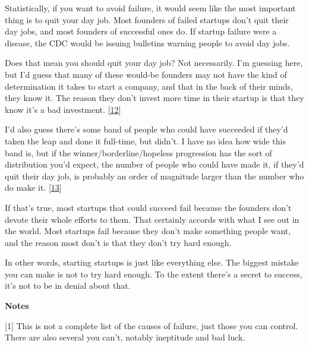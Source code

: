 Statistically, if you
                    want to avoid failure, it would seem like the most important
                    thing is to quit your day job. Most founders of failed
                    startups don't quit their day jobs, and most founders of
                    successful ones do. If startup failure were a disease, the
                    CDC would be issuing bulletins warning people to avoid day
                    jobs.

Does that mean you should quit your day
                    job? Not necessarily. I'm guessing here, but I'd guess that
                    many of these would-be founders may not have the kind of
                    determination it takes to start a company, and that in the
                    back of their minds, they know it. The reason they don't
                    invest more time in their startup is that they know it's a
                    bad investment.
                    [\href{\#f12n}{12}]

I'd also guess there's some band of people who
                    could have succeeded if they'd taken the leap and done it
                    full-time, but didn't. I have no idea how wide this band is,
                    but if the winner/borderline/hopeless progression has the
                    sort of distribution you'd expect, the number of people who
                    could have made it, if they'd quit their day job, is
                    probably an order of magnitude larger than the number who do
                    make it.
                    [\href{\#f13n}{13}]

If that's true, most startups that could
                    succeed fail because the founders don't devote their whole
                    efforts to them. That certainly accords with what I see out
                    in the world. Most startups fail because they don't make
                    something people want, and the reason most don't is that
                    they don't try hard enough.

In other words,
                    starting startups is just like everything else. The biggest
                    mistake you can make is not to try hard enough. To the
                    extent there's a secret to success, it's not to be in denial
                    about that.




                    \textbf{Notes}

[1] This is not a complete list of the causes of failure,
                    just those you can control. There are also several you
                    can't, notably ineptitude and bad luck.

